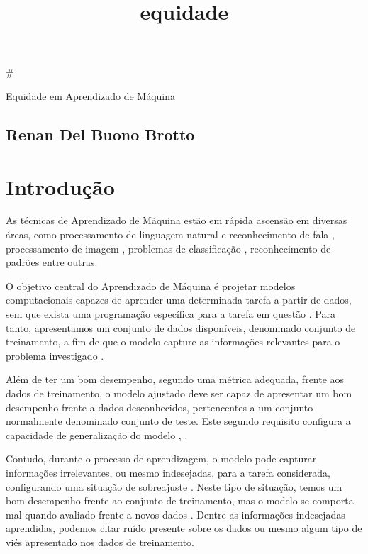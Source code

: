 \documentclass[11pt]{article}
\title{equidade}
\begin{document}
    
    
    \maketitle
    
    

    
    \#

Equidade em Aprendizado de Máquina

\subsection{Renan Del Buono Brotto}\label{renan-del-buono-brotto}

\section{Introdução}\label{introduuxe7uxe3o}

As técnicas de Aprendizado de Máquina estão em rápida ascensão em
diversas áreas, como processamento de linguagem natural e reconhecimento
de fala \cite{Kamath2019}, processamento de imagem \cite{Cipolla2013},
problemas de classificação \cite{Duda2000}, reconhecimento de padrões
\cite{Bishop2006} entre outras.

O objetivo central do Aprendizado de Máquina é projetar modelos
computacionais capazes de aprender uma determinada tarefa a partir de
dados, sem que exista uma programação específica para a tarefa em
questão \cite{Samuel1959}. Para tanto, apresentamos um conjunto de dados
disponíveis, denominado conjunto de treinamento, a fim de que o modelo
capture as informações relevantes para o problema investigado
\cite{Hastie2009}.

Além de ter um bom desempenho, segundo uma métrica adequada, frente aos
dados de treinamento, o modelo ajustado deve ser capaz de apresentar um
bom desempenho frente a dados desconhecidos, pertencentes a um conjunto
normalmente denominado conjunto de teste. Este segundo requisito
configura a capacidade de generalização do modelo \cite{Bishop2006},
\cite{haykin-rn}.

Contudo, durante o processo de aprendizagem, o modelo pode capturar
informações irrelevantes, ou mesmo indesejadas, para a tarefa
considerada, configurando uma situação de sobreajuste \cite{haykin-rn}.
Neste tipo de situação, temos um bom desempenho frente ao conjunto de
treinamento, mas o modelo se comporta mal quando avaliado frente a novos
dados \cite{Bishop2006}. Dentre as informações indesejadas aprendidas,
podemos citar ruído presente sobre os dados \cite{Bishop2006} ou mesmo
algum tipo de viés apresentado nos dados de treinamento.
\end{document}

